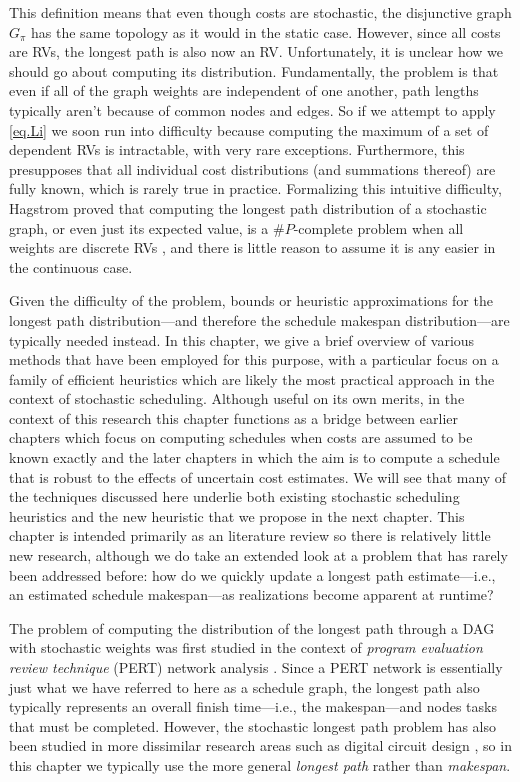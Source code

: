 \documentclass[12pt]{article}
\begin{document}
This definition means that even though costs are stochastic, the disjunctive graph $G_\pi$ has the same topology as it would in the static case. However, since all costs are RVs, the longest path is also now an RV. Unfortunately, it is unclear how we should go about computing its distribution. Fundamentally, the problem is that even if all of the graph weights are independent of one another, path lengths typically aren't because of common nodes and edges. So if we attempt to apply \eqref{eq.Li} we soon run into difficulty because computing the maximum of a set of dependent RVs is intractable, with very rare exceptions. Furthermore, this presupposes that all individual cost distributions (and summations thereof) are fully known, which is rarely true in practice. Formalizing this intuitive difficulty, Hagstrom proved that computing the longest path distribution of a stochastic graph, or even just its expected value, is a $\#P$-complete problem when all weights are discrete RVs \cite{hag88}, and there is little reason to assume it is any easier in the continuous case.      

Given the difficulty of the problem, bounds or heuristic approximations for the longest path distribution---and therefore the schedule makespan distribution---are typically needed instead. In this chapter, we give a brief overview of various methods that have been employed for this purpose, with a particular focus on a family of efficient heuristics which are likely the most practical approach in the context of stochastic scheduling. Although useful on its own merits, in the context of this research this chapter functions as a bridge between earlier chapters which focus on computing schedules when costs are assumed to be known exactly and the later chapters in which the aim is to compute a schedule that is robust to the effects of uncertain cost estimates. We will see that many of the techniques discussed here underlie both existing stochastic scheduling heuristics and the new heuristic that we propose in the next chapter. This chapter is intended primarily as an literature review so there is relatively little new research, although we do take an extended look at a problem that has rarely been addressed before: how do we quickly update a longest path estimate---i.e., an estimated schedule makespan---as realizations become apparent at runtime? 

The problem of computing the distribution of the longest path through a DAG with stochastic weights was first studied in the context of {\em program evaluation review technique} (PERT) network analysis \cite{mal59}. Since a PERT network is essentially just what we have referred to here as a schedule graph, the longest path also typically represents an overall finish time---i.e., the makespan---and nodes tasks that must be completed. However, the stochastic longest path problem has also been studied in more dissimilar research areas such as digital circuit design \cite{bla08}, so in this chapter we typically use the more general {\em longest path} rather than {\em makespan}.  
\end{document}
